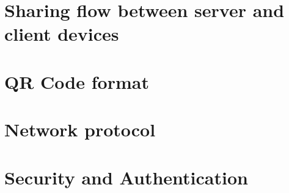 \documentclass[12pt,notitlepage,letterpaper]{article}
\begin{document}
\section{Sharing flow between server and client devices}

\section{QR Code format}

\section{Network protocol}

\section{Security and Authentication}
\end{document}
